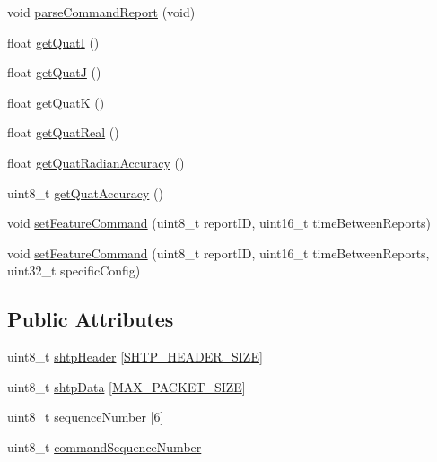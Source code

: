 \begin{DoxyCompactItemize}
\item 
void \mbox{\hyperlink{classBNO080_a9e3c4765c00091b4766699e0d854de80}{parse\+Command\+Report}} (void)
\item 
float \mbox{\hyperlink{classBNO080_aa75bbd109ac767de5d588ad1151322c8}{get\+QuatI}} ()
\item 
float \mbox{\hyperlink{classBNO080_a2ca55d6200af2629d1d80e6c5577cb63}{get\+QuatJ}} ()
\item 
float \mbox{\hyperlink{classBNO080_abeb09e3600b140d7447d9e6a9ac81ad8}{get\+QuatK}} ()
\item 
float \mbox{\hyperlink{classBNO080_a3b0b23d3d061baff2858ffa440bc2b77}{get\+Quat\+Real}} ()
\item 
float \mbox{\hyperlink{classBNO080_a10b5cd695195620c7238cd48a7e366f5}{get\+Quat\+Radian\+Accuracy}} ()
\item 
uint8\+\_\+t \mbox{\hyperlink{classBNO080_a35edcb9c8ffa4919d143472532ea7956}{get\+Quat\+Accuracy}} ()
\item 
void \mbox{\hyperlink{classBNO080_ad8ee71b985377d624e34dda56516ec97}{set\+Feature\+Command}} (uint8\+\_\+t report\+ID, uint16\+\_\+t time\+Between\+Reports)
\item 
void \mbox{\hyperlink{classBNO080_ac6c46a2c3e28f36b47123c761186e74d}{set\+Feature\+Command}} (uint8\+\_\+t report\+ID, uint16\+\_\+t time\+Between\+Reports, uint32\+\_\+t specific\+Config)
\end{DoxyCompactItemize}
\subsection*{Public Attributes}
\begin{DoxyCompactItemize}
\item 
uint8\+\_\+t \mbox{\hyperlink{classBNO080_a61af3bfce34b10950631803443273fcf}{shtp\+Header}} \mbox{[}\mbox{\hyperlink{BNO080__Xmega__Lib_8h_aa80b64798e7ac4c96fe314006a5b99e9}{S\+H\+T\+P\+\_\+\+H\+E\+A\+D\+E\+R\+\_\+\+S\+I\+ZE}}\mbox{]}
\item 
uint8\+\_\+t \mbox{\hyperlink{classBNO080_a1dc1f807ca4810d927a4ce9fcaec45ab}{shtp\+Data}} \mbox{[}\mbox{\hyperlink{BNO080__Xmega__Lib_8h_a879456c3b8e2853f7044d764e9c180d4}{M\+A\+X\+\_\+\+P\+A\+C\+K\+E\+T\+\_\+\+S\+I\+ZE}}\mbox{]}
\item 
uint8\+\_\+t \mbox{\hyperlink{classBNO080_affdd3ab68081775957bcc48f51cb0a22}{sequence\+Number}} \mbox{[}6\mbox{]}
\item 
uint8\+\_\+t \mbox{\hyperlink{classBNO080_a86fa467e394e0c130f011d0762522337}{command\+Sequence\+Number}}
\end{DoxyCompactItemize}

